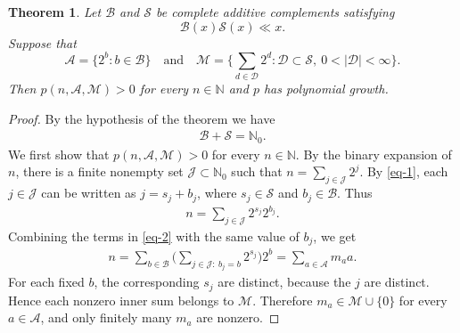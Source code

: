 \documentclass[12pt,a4paper,reqno]{amsart}
\numberwithin{equation}{section}
\def\N{{\mathbb N}}
\theoremstyle{plain}
\newtheorem{theorem}{Theorem}
\theoremstyle{definition}
\begin{document}
\begin{theorem}\label{main-thm}
Let $\mathscr{B}$ and $\mathscr{S}$ be complete additive complements satisfying 
$$
\mathscr{B}(x)\mathscr{S}(x)\ll x.
$$
Suppose that
$$
\mathcal{A}=\big\{2^b: b\in \mathscr{B}\big\} \quad \text{and} \quad \mathcal{M}=\bigg\{\sum_{d\in \mathcal{D}} 2^{d}: \mathcal{D}\subset \mathscr{S},\ 0<|\mathcal{D}|<\infty\bigg\}.
$$
Then $p(n, \mathcal{A}, \mathcal{M})>0$ for every $n\in \N$ and $p$ has polynomial growth.
\end{theorem}
\begin{proof}
By the hypothesis of the theorem we have
\begin{align}\label{eq-1}
\mathscr{B}+\mathscr{S}=\mathbb{N}_0.
\end{align}
We first show that $p(n, \mathcal{A}, \mathcal{M})>0$ for every $n\in \N$. By the binary expansion of $n$, there is a finite nonempty set $\mathcal{J}\subset \N_0$ such that
$
n=\sum_{j\in \mathcal{J}}2^j.
$
By \eqref{eq-1}, each $j\in\mathcal{J}$ can be written as $j=s_j+b_j$, where $s_j\in \mathscr{S}$ and $b_j\in \mathscr{B}$. Thus
\begin{align}\label{eq-2}
n=\sum_{j\in \mathcal{J}}2^{s_j}2^{b_j}.
\end{align}
Combining the terms in \eqref{eq-2} with the same value of $b_j$, we get
\begin{align*}
n=\sum_{b\in\mathscr{B}} \Big(\sum_{j\in\mathcal{J}:\ b_j=b} 2^{s_j}\Big)2^b=
\sum_{a\in \mathcal{A}}m_a a.
\end{align*}
For each fixed $b$, the corresponding $s_j$ are distinct, because the $j$ are distinct. Hence each nonzero inner sum belongs to $\mathcal{M}$. Therefore $m_a\in\mathcal{M}\cup\{0\}$ for every $a\in\mathcal{A}$, and only finitely many $m_a$ are nonzero.


\end{proof}
\end{document}

